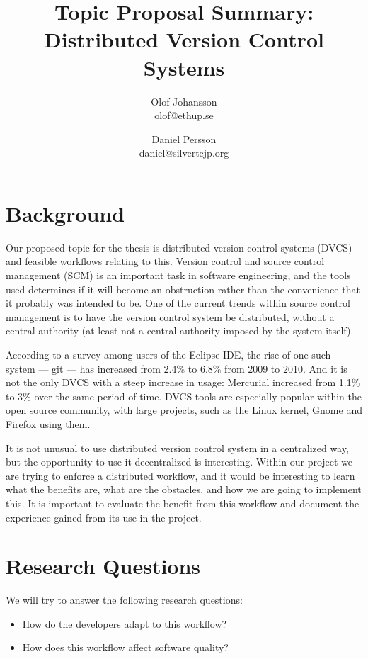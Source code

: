 \documentclass{article}
\title{Topic Proposal Summary: \\ Distributed Version Control Systems}
\author{
Olof Johansson \\\small olof@ethup.se \\
\and Daniel Persson \\\small daniel@silvertejp.org
}
\begin{document}
\maketitle

\section{Background}

Our proposed topic for the thesis is distributed version control systems
(DVCS) and feasible workflows relating to this. Version control and
source control management (SCM) is an important task in software
engineering, and the tools used determines if it will become an
obstruction rather than the convenience that it probably was intended to
be. One of the current trends within source control management is to
have the version control system be distributed\cite{sink10}, without a
central authority (at least not a central authority imposed by the
system itself).

According to a survey among users of the Eclipse IDE\cite{eclipse10}, the 
rise of one such system --- git --- has increased from 2.4\% to 6.8\% from 
2009 to 2010. And it is not the only DVCS with a steep increase in usage: 
Mercurial increased from 1.1\% to 3\% over the same period of time. 
DVCS tools are especially popular within the open source community, 
with large projects, such as the Linux kernel\cite{kernel-git}, 
Gnome\cite{gnome-git} and Firefox\cite{firefox-hg} using them.

It is not unusual to use distributed version control system in a 
centralized way, but the opportunity to use it decentralized is 
interesting. Within our project we are trying to enforce a distributed 
workflow, and it would be interesting to learn what the benefits are, 
what are the obstacles, and how we are going to implement this. It is
important to evaluate the benefit from this workflow and document the
experience gained from its use in the project.

\section{Research Questions}

We will try to answer the following research questions:

\begin{itemize}
	\item How do the developers adapt to this workflow? 
	\item How does this workflow affect software quality?
\end{itemize}
\end{document}
